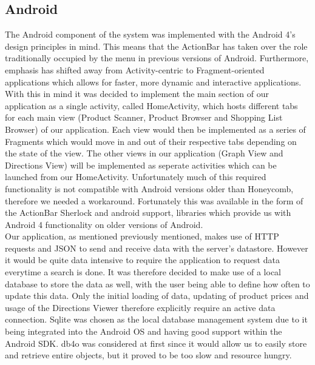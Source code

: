 \subsection{Android}
The Android component of the system was implemented with the Android 4's design principles in mind. 
This means that the ActionBar has taken over the role traditionally occupied by the menu in previous versions of Android. 
Furthermore, emphasis has shifted away from Activity-centric to Fragment-oriented applications which allows for faster,
 more dynamic and interactive applications. With this in mind it was decided to
 implement the main section of our application as a single activity, called
 HomeActivity, which hosts different tabs for each main view (Product Scanner,
 Product Browser and Shopping List Browser) of our application.
 Each view would then be implemented as a series of Fragments which would move in and out of
 their respective tabs depending on the state of the view. The other views in
 our application (Graph View and Directions View) will be implemented as
 seperate activities which can be launched from our HomeActivity. Unfortunately
 much of this required functionality is not compatible with Android versions
 older than Honeycomb, therefore we needed a workaround. Fortunately this was
 available in the form of the ActionBar Sherlock and android support, libraries
 which provide us with Android 4 functionality on older versions of Android.  \\
 Our application, as mentioned previously mentioned, makes use of HTTP requests
 and JSON to send and receive data with the server's datastore. However it would
 be quite data intensive to require the application to request data everytime a
 search is done. It was therefore decided to make use of a local database to
 store the data as well, with the user being able to define how often to update
 this data. Only the initial loading of data, updating of product prices and
 usage of the Directions Viewer therefore explicitly require an active data
 connection. Sqlite was chosen as the local database management system due to it
 being integrated into the Android OS and having good support within the Android
 SDK. db4o was considered at first since it would allow us to easily store and
 retrieve entire objects, but it proved to be too slow and resource hungry.





